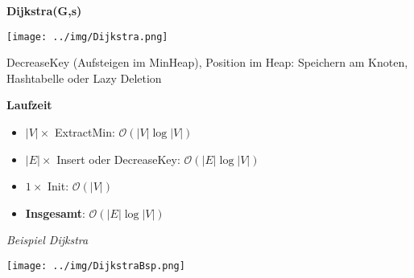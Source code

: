\documentclass[german]{latex4ei/latex4ei_sheet}
\begin{document}
\begin{sectionbox}
\textbf{Dijkstra(G,s)}\par
\texttt{[image: ../img/Dijkstra.png]}\par
DecreaseKey (Aufsteigen im MinHeap), Position im Heap: Speichern am Knoten, Hashtabelle oder Lazy Deletion\par\smallskip
\textbf{Laufzeit}\par
\begin{itemize}
    \item $|V| \times$ ExtractMin: $\mathcal{O}(|V| \log |V|)$
    \item $|E| \times$ Insert oder DecreaseKey: $\mathcal{O}(|E| \log |V|)$
    \item $1 \times$ Init: $\mathcal{O}(|V|)$
    \item \textbf{Insgesamt}: $\mathcal{O}(|E| \log |V|)$
\end{itemize}

\end{sectionbox}
\begin{sectionbox}
\textit{Beispiel Dijkstra}\par
\texttt{[image: ../img/DijkstraBsp.png]}\par
\end{sectionbox}

\vspace{300px}
\end{document}
